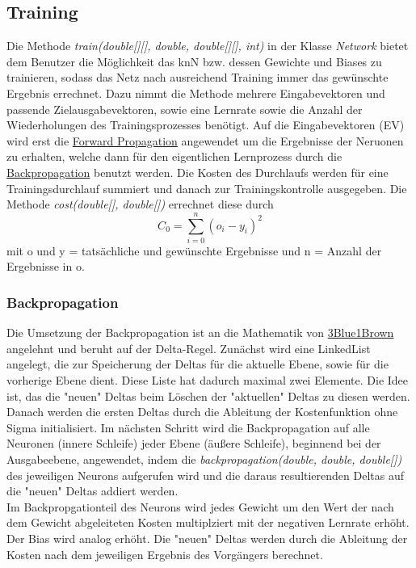\documentclass[paper=A4,pagesize=auto,12pt,headinclude=true,footinclude=true,BCOR=0mm,DIV=calc]{scrartcl}
\begin{document}
\subsection{Training}
Die Methode \textit{train(double[][], double, double[][], int)} in der Klasse \textit{Network} bietet dem Benutzer die Möglichkeit das knN bzw. dessen Gewichte und Biases zu trainieren, sodass das Netz nach ausreichend Training immer das gewünschte Ergebnis errechnet. Dazu nimmt die Methode mehrere Eingabevektoren und passende Zielausgabevektoren, sowie eine Lernrate sowie die Anzahl der Wiederholungen des Trainingsprozesses benötigt. Auf die Eingabevektoren (EV) wird erst die \hyperlink{forwardprop}{Forward Propagation} angewendet um die Ergebnisse der Neruonen zu erhalten, welche dann für den eigentlichen Lernprozess durch die \hyperlink{backprop}{Backpropagation} benutzt werden. Die Kosten des Durchlaufs werden für eine Trainingsdurchlauf summiert und danach zur Trainingskontrolle ausgegeben. Die Methode \textit{cost(double[], double[])} errechnet diese durch
\begin{equation}
	C_0 = \sum_{i=0}^{n} (o_{i} - y_{i})^2
\end{equation}
mit o und y = tatsächliche und gewünschte Ergebnisse und n = Anzahl der Ergebnisse in o.

\hypertarget{backprop}{\subsubsection{Backpropagation}}
Die Umsetzung der Backpropagation ist an die Mathematik von \hyperlink{3b1b}{3Blue1Brown} angelehnt und beruht auf der Delta-Regel. Zunächst wird eine LinkedList angelegt, die zur Speicherung der Deltas für die aktuelle Ebene, sowie für die vorherige Ebene dient. Diese Liste hat dadurch maximal zwei Elemente. Die Idee ist, das die "neuen" Deltas beim Löschen der "aktuellen" Deltas zu diesen werden. Danach werden die ersten Deltas durch die Ableitung der Kostenfunktion ohne Sigma initialisiert. Im nächsten Schritt wird die Backpropagation auf alle Neuronen (innere Schleife) jeder Ebene (äußere Schleife), beginnend bei der Ausgabeebene, angewendet, indem die \textit{backpropagation(double, double, double[])} des jeweiligen Neurons aufgerufen wird und die daraus resultierenden Deltas auf die "neuen" Deltas addiert werden.\\Im Backpropgationteil des Neurons wird jedes Gewicht um den Wert der nach dem Gewicht abgeleiteten Kosten multiplziert mit der negativen Lernrate erhöht. Der Bias wird analog erhöht. Die "neuen" Deltas werden durch die Ableitung der Kosten nach dem jeweiligen Ergebnis des Vorgängers berechnet.
\end{document}
